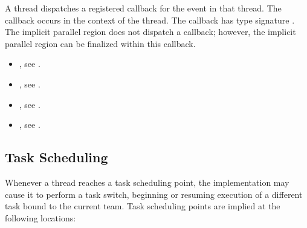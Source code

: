 A thread dispatches a registered 
callback for the  event in that thread.
The callback occurs in the context of the thread.  The callback has type signature
.
The implicit parallel region does not dispatch a  callback;
however, the implicit parallel region can be finalized within this 
callback.

\crossreferences
\begin{itemize}

\item {}, see
.

\item {}, see
  .

\item {}, see
  .

\item {}, see
.


\end{itemize}

\subsection{Task Scheduling}
\label{subsec:Task Scheduling}
Whenever a thread reaches a task scheduling point, the implementation may cause it to
perform a task switch, beginning or resuming execution of a different task bound to the
current team. Task scheduling points are implied at the following locations:

